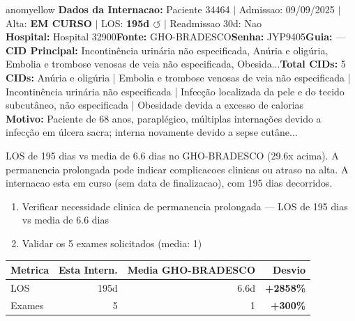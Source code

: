 \documentclass[a4paper,10pt]{article}
\begin{document}
\begin{anomalycard}[Internacao 91285 | GHO-BRADESCO | MODERADO (z=2.28)]{anomyellow}
\textbf{Dados da Internacao:} Paciente 34464 $\mid$ Admissao: 09/09/2025 $\mid$ Alta: \textcolor{anomorange}{\textbf{EM CURSO}} $\mid$ LOS: \textbf{195d \textcolor{anomorange}{$\circlearrowleft$}} $\mid$ Readmissao 30d: Nao\\
\textbf{Hospital:} Hospital 32900\quad\textbf{Fonte:} GHO-BRADESCO\quad\textbf{Senha:} JYP9405\quad\textbf{Guia:} ---\\
\textbf{CID Principal:} {\small Incontinência urinária não especificada, Anúria e oligúria, Embolia e trombose venosas de veia não especificada, Obesida...}\quad\textbf{Total CIDs:} 5\\

\textbf{CIDs:} {\scriptsize Anúria e oligúria | Embolia e trombose venosas de veia não especificada | Incontinência urinária não especificada | Infecção localizada da pele e do tecido subcutâneo, não especificada | Obesidade devida a excesso de calorias}\\

\textbf{Motivo:} {\scriptsize Paciente de 68 anos, paraplégico, múltiplas internações devido a infecção em úlcera sacra; interna novamente devido a sepse cutâne...}\\

\vspace{2pt}\begin{tcolorbox}[colback=severityred!20,colframe=anomyellow,title={\textbf{Interpretacao de Negocio}},fonttitle=\bfseries\small,left=4pt,right=4pt,top=3pt,bottom=3pt]
{\small LOS de 195 dias vs media de 6.6 dias no GHO-BRADESCO (29.6x acima). A permanencia prolongada pode indicar complicacoes clinicas ou atraso na alta. A internacao esta em curso (sem data de finalizacao), com 195 dias decorridos.}
\end{tcolorbox}
\begin{tcolorbox}[colback=severityyellow!30,colframe=anomorange,title={\textbf{Recomendacoes Especificas}},fonttitle=\bfseries\small,left=4pt,right=4pt,top=3pt,bottom=3pt]
\begin{enumerate}[nosep,leftmargin=16pt]
\item {\small Verificar necessidade clinica de permanencia prolongada --- LOS de 195 dias vs media de 6.6 dias}
\item {\small Validar os 5 exames solicitados (media: 1)}
\end{enumerate}
\end{tcolorbox}
\begin{center}\begin{tabular}{l r r r}\toprule\textbf{Metrica} & \textbf{Esta Intern.} & \textbf{Media GHO-BRADESCO} & \textbf{Desvio} \\\midrule
LOS & 195d & 6.6d & \textcolor{anomred}{\textbf{+2858\%}} \\
Exames & 5 & 1 & \textcolor{anomred}{\textbf{+300\%}} \\
\bottomrule\end{tabular}\end{center}


\end{anomalycard}
\end{document}
